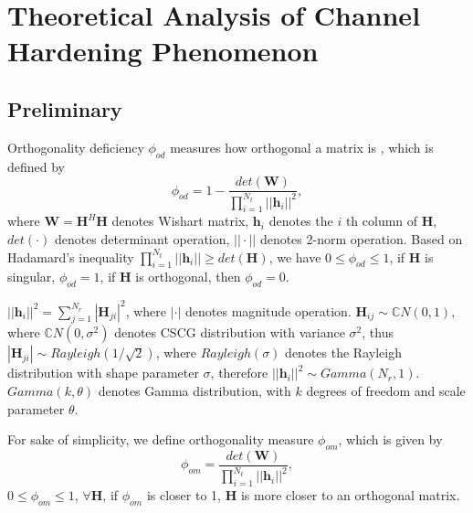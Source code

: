 \documentclass[12pt, draftclsnofoot, onecolumn]{IEEEtran}
\begin{document}
 
\section{Theoretical Analysis of Channel Hardening Phenomenon}
\subsection{Preliminary}
Orthogonality deficiency $\phi_{od}$ measures  how orthogonal a matrix is \cite{ma2008performance}, which is defined by
\begin{equation}
\phi_{od}=1-\frac{det(\mathbf{W})}{\prod_{i=1}^{N_{t}}||\mathbf{h}_{i}||^{2}},
\label{OD}
\end{equation}
where $\mathbf{W}=\mathbf{H}^{H}\mathbf{H}$ denotes Wishart matrix, $\mathbf{h}_{i}$ denotes the $i$ th column of $\mathbf{H}$, $det(\cdot)$ denotes determinant operation, $||\cdot||$ denotes 2-norm operation. Based on Hadamard's inequality $\prod_{i=1}^{N_{t}}||\mathbf{h}_{i}||\geq det(\mathbf{H})$, we have $0\leq\phi_{od}\leq 1$, if $\mathbf{H}$ is singular, $\phi_{od}=1$, if $\mathbf{H}$ is orthogonal, then $\phi_{od}=0$.

$||\mathbf{h}_{i}||^{2}=\sum_{j=1}^{N_{r}}|\mathbf{H}_{ji}|^{2}$, where $|\cdot|$ denotes magnitude operation. $\mathbf{H}_{ij}\sim \mathbb{C}N(0,1)$, where $\mathbb{C}N(0, \sigma^{2})$ denotes CSCG distribution with variance $\sigma^{2}$, thus $|\mathbf{H}_{ji}|\sim Rayleigh(1/\sqrt{2})$, where $Rayleigh(\sigma)$ denotes the Rayleigh distribution with shape parameter $\sigma$, therefore $||\mathbf{h}_{i}||^{2}\sim Gamma(N_{r},1)$\cite{papoulis2002probability}. $Gamma(k,\theta)$ denotes Gamma distribution, with $k$ degrees of freedom and scale parameter $\theta$.

For sake of simplicity, we define orthogonality measure $\phi_{om}$, which is given by 
\begin{equation}
\phi_{om}=\frac{det(\mathbf{W})}{\prod_{i=1}^{N_{t}}||\mathbf{h}_{i}||^{2}},
\label{OM}
\end{equation}
$0\leq \phi_{om}\leq 1$, $\forall \mathbf{H}$, if $\phi_{om}$ is closer to 1, $\mathbf{H}$ is more closer to an orthogonal matrix. 
\end{document}

